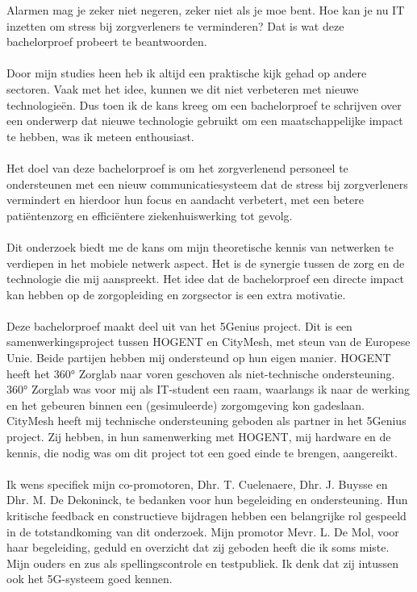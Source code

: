 Alarmen mag je zeker niet negeren, zeker niet als je moe bent. Hoe kan je nu IT inzetten om stress bij zorgverleners te verminderen? Dat is wat deze bachelorproef probeert te beantwoorden.
\\\\
Door mijn studies heen heb ik altijd een praktische kijk gehad op andere sectoren. Vaak met het idee, kunnen we dit niet verbeteren met nieuwe technologieën. Dus toen ik de kans kreeg om een bachelorproef te schrijven over een onderwerp dat nieuwe technologie gebruikt om een maatschappelijke impact te hebben, was ik meteen enthousiast.
\\\\
Het doel van deze bachelorproef is om het zorgverlenend personeel te ondersteunen met een nieuw communicatiesysteem dat de stress bij zorgverleners vermindert en hierdoor hun focus en aandacht verbetert, met een betere patiëntenzorg en efficiëntere ziekenhuiswerking tot gevolg.
\\\\
Dit onderzoek biedt me de kans om mijn theoretische kennis van netwerken te verdiepen in het mobiele netwerk aspect. Het is de synergie tussen de zorg en de technologie die mij aanspreekt. Het idee dat de bachelorproef een directe impact kan hebben op de zorgopleiding en zorgsector is een extra motivatie.
\\\\
Deze bachelorproef maakt deel uit van het 5Genius project. Dit is een samenwerkingsproject tussen HOGENT en CityMesh, met steun van de Europese Unie. Beide partijen hebben mij ondersteund op hun eigen manier. HOGENT heeft het 360° Zorglab naar voren geschoven als niet-technische ondersteuning. 360° Zorglab was voor mij als IT-student een raam, waarlangs ik naar de werking en het gebeuren binnen een (gesimuleerde) zorgomgeving kon gadeslaan. CityMesh heeft mij technische ondersteuning geboden als partner in het 5Genius project. Zij hebben, in hun samenwerking met HOGENT, mij hardware en de kennis, die nodig was om dit project tot een goed einde te brengen, aangereikt.
\\\\
Ik wens specifiek mijn co-promotoren, Dhr. T. Cuelenaere, Dhr. J. Buysse en Dhr. M. De Dekoninck, te bedanken voor hun begeleiding en ondersteuning. Hun kritische feedback en constructieve bijdragen hebben een belangrijke rol gespeeld in de totstandkoming van dit onderzoek. Mijn promotor Mevr. L. De Mol, voor haar begeleiding, geduld en overzicht dat zij geboden heeft die ik soms miste.
Mijn ouders en zus als spellingscontrole en testpubliek. Ik denk dat zij intussen ook het 5G-systeem goed kennen.

